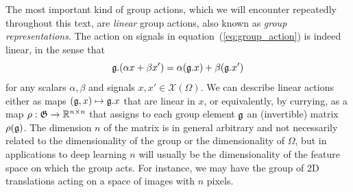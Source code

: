 %

The most important kind of group actions, which we will encounter repeatedly throughout this text, are \emph{linear} group actions, also known as {\em group representations}.
The action on signals in equation~(\ref{eq:group_action}) is indeed linear, in the sense that 
$$
{\mathfrak{g}} . (\alpha x + \beta x') = \alpha ({\mathfrak{g}} . x) + \beta ({\mathfrak{g}} . x') $$
%
for any scalars $\alpha, \beta$ and signals $x, x' \in \mathcal{X}(\Omega)$. 
%
We can describe linear actions either as maps $({\mathfrak{g}}, x) \mapsto {\mathfrak{g}}.x$ that are linear in $x$, or equivalently, by currying, 
as a map $\rho : {\mathfrak{G}} \rightarrow \mathbb{R}^{n \times n}$ that assigns to each group element ${\mathfrak{g}}$ an (invertible) matrix $\rho({\mathfrak{g}})$.
The dimension $n$ of the matrix is in general arbitrary and not necessarily related to the dimensionality of the group or the dimensionality of $\Omega$, but in applications to deep learning $n$ will usually be the dimensionality of the feature space on which the group acts.
For instance, we may have the group of 2D translations acting on a space of images with $n$ pixels.

